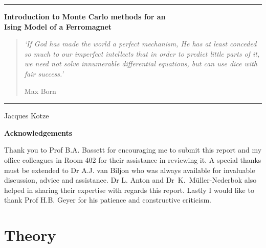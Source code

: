 \documentclass[a4paper]{article}
\newcommand{\Hrule}{\rule{\linewidth}{1mm}}
\begin{document}
\newpage

\thispagestyle{empty}

\noindent
\Hrule
\begin{center}
  \huge {\bf Introduction to Monte Carlo methods for an \\ Ising Model of a Ferromagnet} \\[8mm]
  \large 
  \begin{quotation}
    {\itshape `If God has made the world a perfect
      mechanism, He has at least conceded so much to our imperfect
      intellects that in order to predict little parts of it, we need
      not solve innumerable differential equations, but can use dice
      with fair success.' }
      \begin{flushleft}
        Max Born
      \end{flushleft}
  \end{quotation}
\end{center}
\Hrule
{}
\begin{flushright}
  \Large{Jacques Kotze}
\end{flushright}

\newpage
\setcounter{page}{1}

\tableofcontents
\vspace{1.5cm}
\noindent
{\large {\bf Acknowledgements}}
\vspace{0.5cm}

Thank you to Prof B.A. Bassett for encouraging me to submit this report and my office colleagues in Room 402 for their assistance in reviewing it. A special thanks must be extended to Dr A.J. van Biljon who was always
available for invaluable discussion, advice and assistance. Dr
L. Anton and Dr~K.~M\"uller-Nederbok also helped in sharing their expertise 
with regards this report. Lastly I would like to thank Prof
H.B. Geyer for his patience and constructive criticism.
\newpage

 
\section{Theory}
\end{document}
